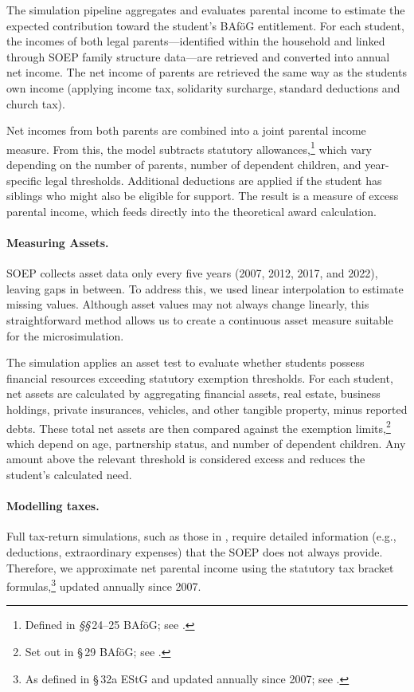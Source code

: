 The simulation pipeline aggregates and evaluates parental income to estimate the expected contribution toward the student’s BAföG entitlement. 
For each student, the incomes of both legal parents—identified within the household and linked through SOEP family structure data—are retrieved and converted into annual net income. 
The net income of parents are retrieved the same way as the students own income (applying income tax, solidarity surcharge, standard deductions and church tax).

Net incomes from both parents are combined into a joint parental income measure. 
From this, the model subtracts statutory allowances,\footnote{Defined in \textit{§§}\,24–25 BAföG; see \citet{bafoeg_law}.} which vary depending on the number of parents, number of dependent children, and year-specific legal thresholds. 
Additional deductions are applied if the student has siblings who might also be eligible for support. 
The result is a measure of excess parental income, which feeds directly into the theoretical award calculation.


\paragraph{Measuring Assets.}
SOEP collects asset data only every five years (2007, 2012, 2017, and 2022), leaving gaps in between. 
To address this, we used linear interpolation to estimate missing values. 
Although asset values may not always change linearly, this straightforward method allows us to create a continuous asset measure suitable for the microsimulation.

The simulation applies an asset test to evaluate whether students possess financial resources exceeding statutory exemption thresholds. 
For each student, net assets are calculated by aggregating financial assets, real estate, business holdings, private insurances, vehicles, and other tangible property, minus reported debts. 
These total net assets are then compared against the exemption limits,\footnote{Set out in §\,29 BAföG; see \citet{bafoeg_law}.} which depend on age, partnership status, and number of dependent children. 
Any amount above the relevant threshold is considered excess and reduces the student's calculated need.

\paragraph{Modelling taxes.}
Full tax-return simulations, such as those in \cite{herber_non-take-up_2019}, require detailed information (e.g., deductions, extraordinary expenses) that the SOEP does not always provide.  
Therefore, we approximate net parental income using the statutory tax bracket formulas,\footnote{As defined in §\,32a EStG and updated annually since 2007; see \citet{estg_law,estg_2025,estg_2024,estg_2023,estg_2022,estg_2021,estg_2020,estg_2019,estg_2018,estg_2017,estg_2016,estg_2015,estg_2014,estg_2013,estg_2012,estg_2007,estg_2006}.} updated annually since 2007.

